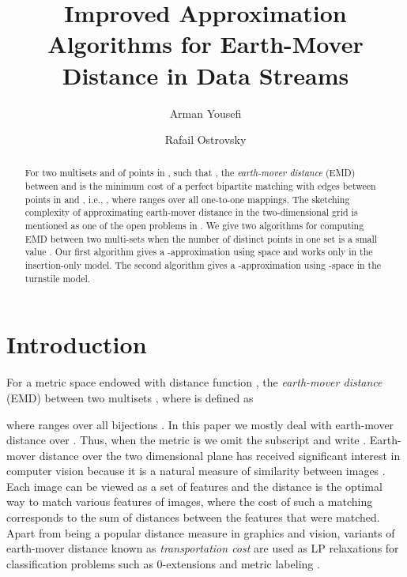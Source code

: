 \documentclass[oribibl]{llncs}
\title{Improved Approximation Algorithms for Earth-Mover
Distance in Data Streams}
\author{Arman Yousefi\and Rafail Ostrovsky}
\institute{University of California Los Angeles\\
\email{\{armany, rafail\}@cs.ucla.edu}}
\begin{document}
\maketitle

\begin{abstract}
For two multisets  and  of points in ,
such that ,
the \textit{earth-mover distance} (EMD) between  and  is the minimum cost
of a perfect bipartite matching with edges between points in  and , i.e., 
,
where  ranges over all one-to-one mappings. The sketching complexity of
approximating earth-mover distance in the two-dimensional grid is mentioned
as one of the open problems in \cite{openproblems1, openproblems2}. 
We give two algorithms for computing EMD between two multi-sets when
the number of distinct points in one set is a small value
.
Our first algorithm gives a -approximation using
 space and works only in the
insertion-only model.
The second algorithm gives a -approximation
using -space in the turnstile model. 
\end{abstract}

\section{Introduction}
For a metric space  endowed with distance function ,
the \textit{earth-mover distance} (EMD) between two multisets ,
where  is defined as

where  ranges over all bijections .
In this paper we mostly deal with earth-mover distance over .
Thus, when the metric  is  we omit the subscript and 
write .
Earth-mover distance over the two dimensional plane has received significant
interest in computer vision because it is a natural measure of
similarity between images \cite{tommasi, tommasi2, grayspace, thaper}.
Each image can be viewed as a set of features and the distance is the optimal
way to match various features of images, where the
cost of such a matching corresponds to the sum of distances between the features
that were matched.
Apart from being a popular
distance measure in graphics and vision, variants of earth-mover distance known
as \textit{transportation cost} are used as LP relaxations for
classification problems such as 0-extensions and metric labeling
\cite{classification_metric, metric_labeling, charikar}.
\end{document}
